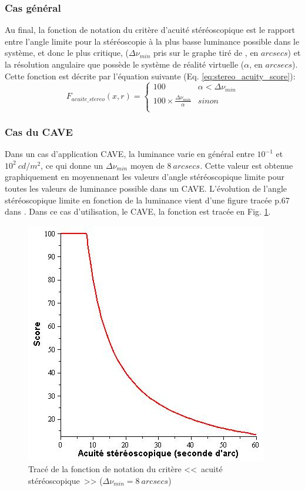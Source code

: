 	\subsubsection{Cas général}	
	\par Au final, la fonction de notation du critère d'acuité stéréoscopique est le rapport entre l'angle limite pour la stéréoscopie à la plus basse luminance possible dans le système, et donc le plus critique, ($\Delta \nu_{min}$ pris sur le graphe tiré de  \citep{gross_human_2008}, en $arcsecs$) et la résolution angulaire que possède le système de réalité virtuelle ($\alpha$, en $arcsecs$). Cette fonction est décrite par l'équation suivante (Eq. \ref{eq:stereo_acuity_score}):
	\begin{equation}
		F_{acuite\_stereo}(x,r) = \begin{cases}
		100 & \alpha < \Delta \nu_{min}\\
		100 \times \frac{\Delta \nu_{min}}{\alpha} & sinon\\
		\end{cases}
		\label{eq:stereo_acuity_score}
	\end{equation}
	
	\subsubsection{Cas du CAVE}	
	\par Dans un cas d'application CAVE, la luminance varie en général entre $10^{-1}$ et $10^{2}~cd/m^2$, ce qui donne un $\Delta \nu_{min}$ moyen de $8~arcsecs$. Cette valeur est obtenue graphiquement en moyennenant les valeurs d'angle stéréoscopique limite pour toutes les valeurs de luminance possible dans un CAVE. L'évolution de l'angle stéréoscopique limite en fonction de la luminance vient d'une figure tracée p.67 dans \citep{gross_human_2008}. Dans ce cas d'utilisation, le CAVE, la fonction est tracée en Fig. \ref{fig:stereo_acuity}.
	
	\begin{figure}
		\centering
		\includegraphics[scale=.75]{Figures/StereoAcuity}
		\caption{Tracé de la fonction de notation du critère <<~acuité stéréoscopique~>> ($\Delta \nu_{min} = 8~arcsecs$)}
		\label{fig:stereo_acuity}
	\end{figure}